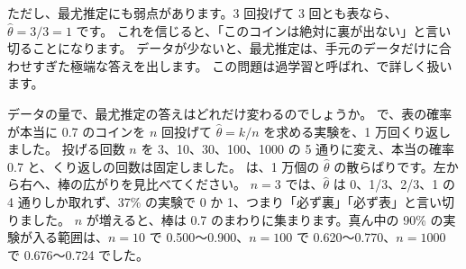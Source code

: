 ただし、最尤推定にも弱点があります。3 回投げて 3 回とも表なら、$\hat\theta=3/3=1$ です。
これを信じると、「このコインは絶対に裏が出ない」と言い切ることになります。
データが少ないと、最尤推定は、手元のデータだけに合わせすぎた極端な答えを出します。
この問題は過学習と呼ばれ、で詳しく扱います。

データの量で、最尤推定の答えはどれだけ変わるのでしょうか。
 で、表の確率が本当に 0.7 のコインを $n$ 回投げて $\hat\theta=k/n$ を求める実験を、1 万回くり返しました。
投げる回数 $n$ を 3、10、30、100、1000 の 5 通りに変え、本当の確率 0.7 と、くり返しの回数は固定しました。
は、1 万個の $\hat\theta$ の散らばりです。左から右へ、棒の広がりを見比べてください。
$n=3$ では、$\hat\theta$ は 0、1/3、2/3、1 の 4 通りしか取れず、37\% の実験で 0 か 1、つまり「必ず裏」「必ず表」と言い切りました。
$n$ が増えると、棒は 0.7 のまわりに集まります。真ん中の 90\% の実験が入る範囲は、$n=10$ で 0.500〜0.900、$n=100$ で 0.620〜0.770、$n=1000$ で 0.676〜0.724 でした。

